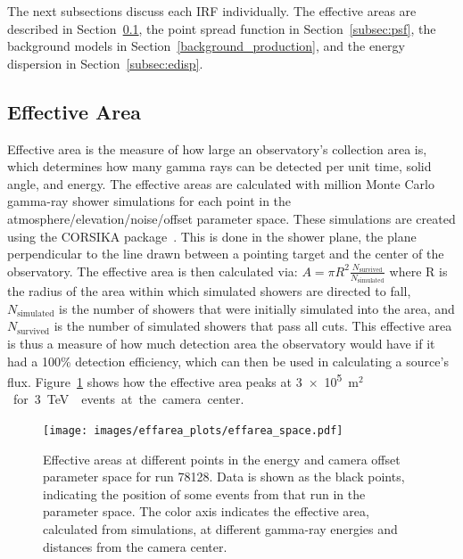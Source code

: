 The next subsections discuss each IRF individually.
The effective areas are described in Section~\ref{subsec:effarea}, the point spread function in Section~\ref{subsec:psf}, the background models in Section~\ref{background_production}, and the energy dispersion in Section~\ref{subsec:edisp}.

\FloatBarrier
  
\subsection{Effective Area}\label{subsec:effarea}
Effective area is the measure of how large an observatory's collection area is, which determines how many gamma rays can be detected per unit time, solid angle, and energy.
The effective areas are calculated with  million Monte Carlo gamma-ray shower simulations for each point in the atmosphere/elevation/noise/offset parameter space.
These simulations are created using the CORSIKA package~\cite{corsika1998}.
This is done in the shower plane, the plane perpendicular to the line drawn between a pointing target and the center of the observatory.
The effective area is then calculated via:
$A=\pi R^2 \frac{N_{\text{survived}}}{N_{\text{simulated}}}$
where R is the radius of the area within which simulated showers are directed to fall, $N_{\text{simulated}}$ is the number of showers that were initially simulated into the area, and $N_{\text{survived}}$ is the number of simulated showers that pass all cuts.
This effective area is thus a measure of how much detection area the observatory would have if it had a 100\% detection efficiency, which can then be used in calculating a source's flux.
Figure~\ref{fig:effarea_paramspace} shows how the effective area peaks at \nicetilde{}\SI{3e5}{m${}^2$} for \SI{3}{\TeV{}} events at the camera center.

\begin{figure}[!t]
  \centering
  \texttt{[image: images/effarea\_plots/effarea\_space.pdf]}
  \caption[Effective Area Parameter Space]{
    Effective areas at different points in the energy and camera offset parameter space for run 78128.
    Data is shown as the black points, indicating the position of some events from that run in the parameter space.
    The color axis indicates the effective area, calculated from simulations, at different gamma-ray energies and distances from the camera center.
  }
  \label{fig:effarea_paramspace}
\end{figure}

